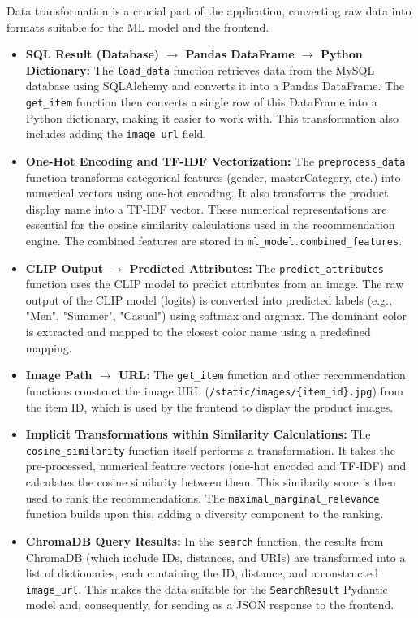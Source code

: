 \documentclass[12pt,a4paper]{article}
\begin{document}
Data transformation is a crucial part of the application, converting raw data into formats suitable for the ML model and the frontend.

\begin{itemize}[leftmargin=*, itemsep=0.3em]
    \item \textbf{SQL Result (Database) $\rightarrow$ Pandas DataFrame $\rightarrow$ Python Dictionary:}  The \texttt{load\_data} function retrieves data from the MySQL database using SQLAlchemy and converts it into a Pandas DataFrame.  The \texttt{get\_item} function then converts a single row of this DataFrame into a Python dictionary, making it easier to work with.  This transformation also includes adding the \texttt{image\_url} field.

    \item \textbf{One-Hot Encoding and TF-IDF Vectorization:}  The \texttt{preprocess\_data} function transforms categorical features (gender, masterCategory, etc.) into numerical vectors using one-hot encoding.  It also transforms the product display name into a TF-IDF vector.  These numerical representations are essential for the cosine similarity calculations used in the recommendation engine.  The combined features are stored in \texttt{ml\_model.combined\_features}.

    \item \textbf{CLIP Output $\rightarrow$ Predicted Attributes:}  The \texttt{predict\_attributes} function uses the CLIP model to predict attributes from an image.  The raw output of the CLIP model (logits) is converted into predicted labels (e.g., "Men", "Summer", "Casual") using softmax and argmax.  The dominant color is extracted and mapped to the closest color name using a predefined mapping.

    \item \textbf{Image Path $\rightarrow$ URL:}  The \texttt{get\_item} function and other recommendation functions construct the image URL (\texttt{/static/images/\{item\_id\}.jpg}) from the item ID, which is used by the frontend to display the product images.

    \item \textbf{Implicit Transformations within Similarity Calculations:} The \texttt{cosine\_similarity} function itself performs a transformation. It takes the pre-processed, numerical feature vectors (one-hot encoded and TF-IDF) and calculates the cosine similarity between them. This similarity score is then used to rank the recommendations. The \texttt{maximal\_marginal\_relevance} function builds upon this, adding a diversity component to the ranking.

    \item \textbf{ChromaDB Query Results:} In the \texttt{search} function, the results from ChromaDB (which include IDs, distances, and URIs) are transformed into a list of dictionaries, each containing the ID, distance, and a constructed \texttt{image\_url}. This makes the data suitable for the \texttt{SearchResult} Pydantic model and, consequently, for sending as a JSON response to the frontend.

\end{itemize}
\end{document}
